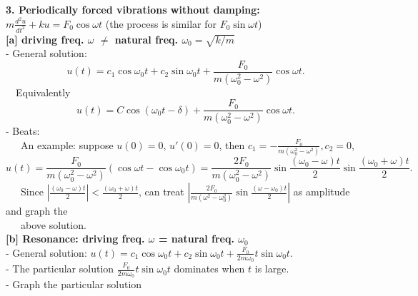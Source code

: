 \documentclass[11pt]{article}
\numberwithin{equation}{section}
\begin{document}
\noindent \textbf{3. Periodically forced vibrations without damping: }\\
\indent \hspace{2in} $m\frac{d^2u}{dt^2}+ku=F_0\cos \omega t $ (the process is similar for $F_0\sin \omega t$)\\
\noindent \textbf{[a] driving freq. $\omega$ $\neq$ natural freq. $\omega_0=\sqrt{k/m}$} \\
\indent - General solution: 
\[u(t)=c_1\cos \omega_0 t+c_2\sin\omega_0 t+\frac{F_0}{m(\omega_0^2-\omega^2)}\cos \omega t.\]
\indent \ \ Equivalently
\[u(t)=C\cos (\omega_0 t-\delta)+\frac{F_0}{m(\omega_0^2-\omega^2)}\cos \omega t.\]
\indent - Beats: \\ 
\indent \ \ \ An example: suppose $u(0)=0$, $u'(0)=0$, then 
$c_1=-\frac{F_0}{m(\omega_0^2-\omega^2)}, c_2=0$,
\[u(t)=\frac{F_0}{m(\omega_0^2-\omega^2)}(\cos \omega t-\cos \omega_0 t)=\frac{2F_0}{m(\omega_0^2-\omega^2)}\sin\frac{(\omega _0-\omega) t}{2}\sin\frac{(\omega_0+\omega)t}{2}.\]
\indent \ \ \  Since $\left |\frac{(\omega _0-\omega) t}{2}\right |<\frac{(\omega_0+\omega)t}{2}$, can treat $\left|\frac{2F_0}{m(\omega^2-\omega_0^2)}\sin\frac{(\omega -\omega_0) t}{2}\right|$ as amplitude and graph the\\
\indent \ \ \ above solution.\\

\noindent \textbf{[b] Resonance: driving freq. $\omega$ = natural freq. $\omega_0$}\\
\indent - General solution: $u(t)=c_1\cos \omega_0 t+c_2\sin \omega_0 t+\frac{F_0}{2m\omega_0}t\sin \omega_0 t$.\\
\indent - The particular solution $\frac{F_0}{2m\omega_0}t\sin \omega_0 t$ dominates when $t$ is large.\\
\indent - Graph the particular solution\\
\end{document}
